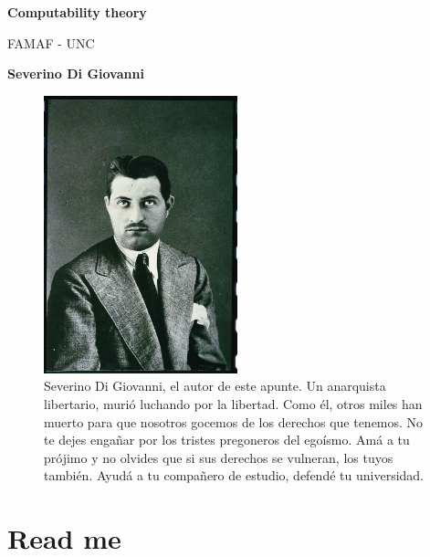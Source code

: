 \documentclass[a4paper, 12pt]{article}
\begin{document}
\begin{titlepage}
   \begin{center}
       \vspace*{1cm}

       \textbf{Computability theory}

       \small
       \vspace{0.5cm}
        FAMAF - UNC
            
       \vspace{1.5cm}
       \footnotesize
       \textbf{Severino Di Giovanni}
       \normalsize

       \vfill
            
            
     
   \end{center}
\end{titlepage}

 \begin{figure}[h!]
 \centering
  \includegraphics[width=0.5\textwidth]{../Images/SeverinoDiGiovanni.jpg}
 \caption{Severino Di Giovanni, el autor de este apunte. Un anarquista
   libertario, murió luchando por la libertad. Como él, otros miles han muerto
   para que nosotros gocemos de los derechos que tenemos. No te dejes engañar
   por los tristes pregoneros del egoísmo. Amá a tu prójimo y no olvides que si
   sus derechos se vulneran, los tuyos también. Ayudá a tu compañero de estudio,
 defendé tu universidad. }
 \end{figure}

\pagebreak

\tableofcontents
\newpage

\section{Read me}
\end{document}
